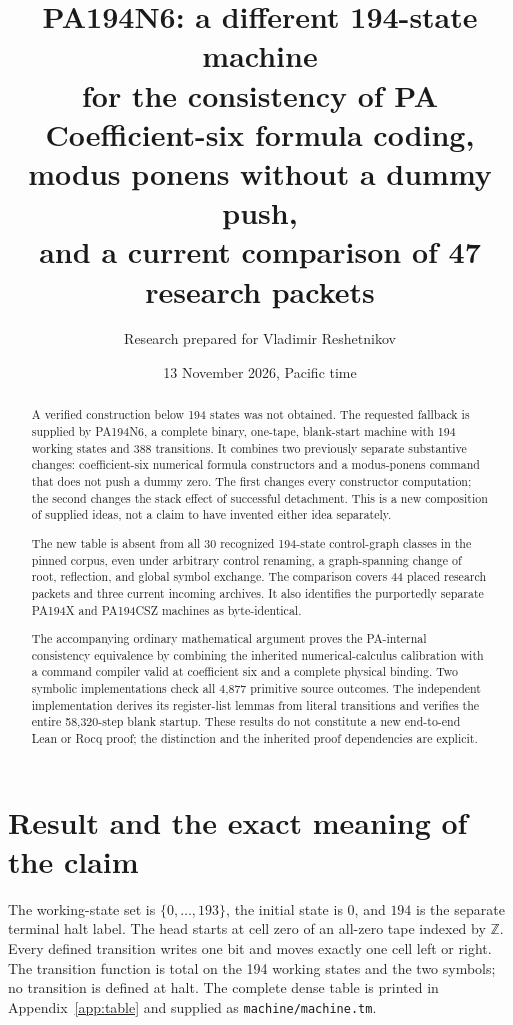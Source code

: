 \documentclass[10pt,letterpaper]{article}
\title{\color{ink}PA194N6: a different 194-state machine\\for the consistency of PA\\[5pt]
\large Coefficient-six formula coding, modus ponens without a dummy push,\\and a current comparison of 47 research packets}
\author{Research prepared for Vladimir Reshetnikov}
\date{13 November 2026, Pacific time}
\newcommand{\file}[1]{\nolinkurl{#1}}
\begin{document}
\maketitle
\begin{abstract}
A verified construction below 194 states was not obtained. The requested
fallback is supplied by PA194N6, a complete binary, one-tape, blank-start
machine with 194 working states and 388 transitions. It combines two
previously separate substantive changes: coefficient-six numerical formula
constructors and a modus-ponens command that does not push a dummy zero.
The first changes every constructor computation; the second changes the
stack effect of successful detachment. This is a new composition of supplied
ideas, not a claim to have invented either idea separately.

The new table is absent from all 30 recognized 194-state control-graph
classes in the pinned corpus, even under arbitrary control renaming,
a graph-spanning change of root, reflection, and global symbol exchange.
The comparison covers 44 placed research packets and three current incoming
archives. It also identifies the purportedly separate PA194X and PA194CSZ
machines as byte-identical.

The accompanying ordinary mathematical argument proves the PA-internal
consistency equivalence by combining the inherited numerical-calculus
calibration with a command compiler valid at coefficient six and a complete
physical binding. Two symbolic implementations check all 4,877 primitive
source outcomes. The independent implementation derives its register-list
lemmas from literal transitions and verifies the entire 58,320-step blank
startup. These results do not constitute a new end-to-end Lean or Rocq proof;
the distinction and the inherited proof dependencies are explicit.
\end{abstract}
\tableofcontents

\section{Result and the exact meaning of the claim}
\label{sec:result}

The working-state set is $\{0,\ldots,193\}$, the initial state is $0$,
and $194$ is the separate terminal halt label. The head starts at cell zero
of an all-zero tape indexed by $\mathbb Z$. Every defined transition writes
one bit and moves exactly one cell left or right. The transition function
is total on the 194 working states and the two symbols; no transition is
defined at halt. The complete dense table is printed in
Appendix~\ref{app:table} and supplied as \file{machine/machine.tm}.
\end{document}

